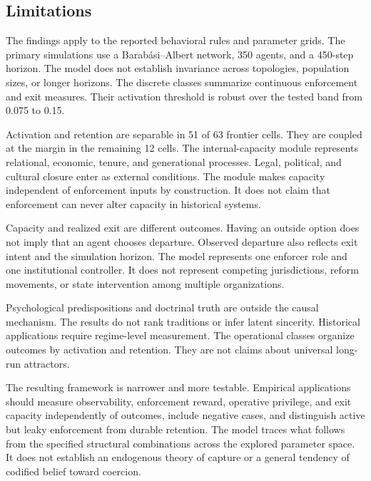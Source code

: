 \documentclass[12pt]{article}
\begin{document}
\subsection{Limitations}

The findings apply to the reported behavioral rules and parameter grids. The primary simulations use a
Barab\'asi--Albert network, 350 agents, and a 450-step horizon. The model does not establish invariance across
topologies, population sizes, or longer horizons. The discrete classes summarize continuous enforcement and exit
measures. Their activation threshold is robust over the tested band from 0.075 to 0.15.

Activation and retention are separable in 51 of 63 frontier cells. They are coupled at the margin in the remaining 12
cells. The internal-capacity module represents relational, economic, tenure, and generational processes. Legal,
political, and cultural closure enter as external conditions. The module makes capacity independent of enforcement
inputs by construction. It does not claim that enforcement can never alter capacity in historical systems.

Capacity and realized exit are different outcomes. Having an outside option does not imply that an agent chooses
departure. Observed departure also reflects exit intent and the simulation horizon. The model represents one enforcer
role and one institutional controller. It does not represent competing jurisdictions, reform movements, or state
intervention among multiple organizations.

Psychological predispositions and doctrinal truth are outside the causal mechanism. The results do not rank traditions
or infer latent sincerity. Historical applications require regime-level measurement. The operational classes organize
outcomes by activation and retention. They are not claims about universal long-run attractors.

The resulting framework is narrower and more testable. Empirical applications should measure observability, enforcement reward, operative privilege, and exit capacity independently of outcomes, include negative cases, and distinguish active but leaky enforcement from durable retention. The model traces what follows from the specified structural combinations across the explored parameter space. It does not establish an endogenous theory of capture or a general tendency of codified belief toward coercion.


\end{document}

